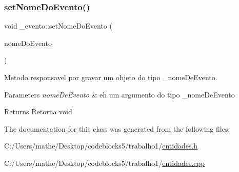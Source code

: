\subsubsection{\texorpdfstring{setNomeDoEvento()}{setNomeDoEvento()}}
{\footnotesize\ttfamily void \+\_\+evento\+::set\+Nome\+Do\+Evento (\begin{DoxyParamCaption}\item[{const \mbox{\hyperlink{class__nome_do_evento}{\+\_\+nome\+Do\+Evento}} \&}]{nome\+Do\+Evento }\end{DoxyParamCaption})}



Metodo responsavel por gravar um objeto do tipo \+\_\+nome\+De\+Evento. 


\begin{DoxyParams}{Parameters}
{\em nome\+De\+Evento} & eh um argumento do tipo \+\_\+nome\+De\+Evento \\
\hline
\end{DoxyParams}
\begin{DoxyReturn}{Returns}
Retorna void 
\end{DoxyReturn}


The documentation for this class was generated from the following files\+:\begin{DoxyCompactItemize}
\item 
C\+:/\+Users/mathe/\+Desktop/codeblocks5/trabalho1/\mbox{\hyperlink{entidades_8h}{entidades.\+h}}\item 
C\+:/\+Users/mathe/\+Desktop/codeblocks5/trabalho1/\mbox{\hyperlink{entidades_8cpp}{entidades.\+cpp}}\end{DoxyCompactItemize}
